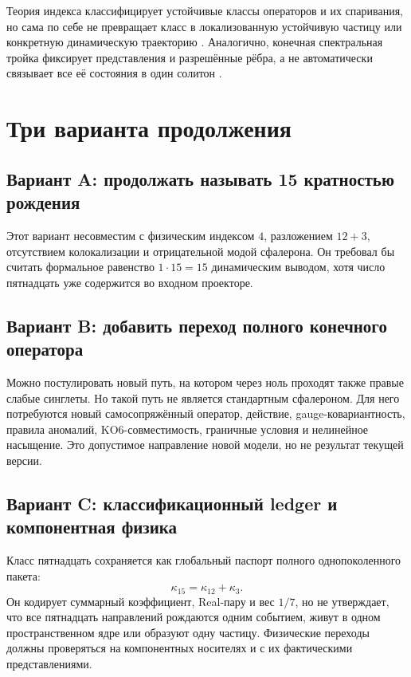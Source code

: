 Теория индекса классифицирует устойчивые классы операторов и их
спаривания, но сама по себе не превращает класс в локализованную
устойчивую частицу или конкретную динамическую траекторию
\cite{class15-role-atiyah-singer1968,
class15-role-kasparov1981}. Аналогично, конечная спектральная тройка
фиксирует представления и разрешённые рёбра, а не автоматически
связывает все её состояния в один солитон
\cite{class15-role-krajewski1998}.

\section{Три варианта продолжения}

\subsection*{Вариант A: продолжать называть 15 кратностью рождения}

Этот вариант несовместим с физическим индексом $4$, разложением
$12+3$, отсутствием колокализации и отрицательной модой сфалерона. Он
требовал бы считать формальное равенство $1\cdot15=15$ динамическим
выводом, хотя число пятнадцать уже содержится во входном проекторе.

\subsection*{Вариант B: добавить переход полного конечного оператора}

Можно постулировать новый путь, на котором через ноль проходят также
правые слабые синглеты. Но такой путь не является стандартным
сфалероном. Для него потребуются новый самосопряжённый оператор,
действие, gauge-ковариантность, правила аномалий, KO6-совместимость,
граничные условия и нелинейное насыщение. Это допустимое направление
новой модели, но не результат текущей версии.

\subsection*{Вариант C: классификационный ledger и компонентная физика}

Класс пятнадцать сохраняется как глобальный паспорт полного
однопоколенного пакета:
\begin{equation}
 \kappa_{15}=\kappa_{12}+\kappa_3.
\end{equation}
Он кодирует суммарный коэффициент, Real-пару и вес $1/7$, но не
утверждает, что все пятнадцать направлений рождаются одним событием,
живут в одном пространственном ядре или образуют одну частицу.
Физические переходы должны проверяться на компонентных носителях и с
их фактическими представлениями.

